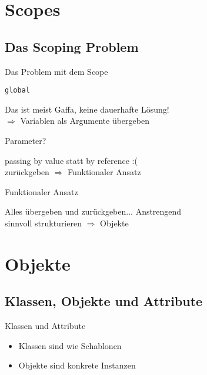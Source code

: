 \section{Scopes}
\subsection{Das Scoping Problem}
\begin{frame}{Das Problem mit dem Scope}
	
\end{frame}

\begin{frame}{\tt global}
	
    Das ist meist Gaffa, keine dauerhafte Lösung! \\
    $\Rightarrow$ Variablen als Argumente übergeben
\end{frame}
\begin{frame}{Parameter?}
	
    \glqq passing by value\grqq{} statt \glqq by reference\grqq{} :( \\
    zurückgeben $\Rightarrow$ Funktionaler Ansatz
\end{frame}
\begin{frame}{Funktionaler Ansatz}
	
    Alles übergeben und zurückgeben... Anstrengend \\
    sinnvoll strukturieren $\Rightarrow$ Objekte
\end{frame}

\section{Objekte}
\subsection{Klassen, Objekte und Attribute}
\begin{frame}{Klassen und Attribute}
	\begin{itemize}
		\item<1-> Klassen sind wie Schablonen
        \item<2-> Objekte sind konkrete Instanzen
	\end{itemize}
\end{frame}

